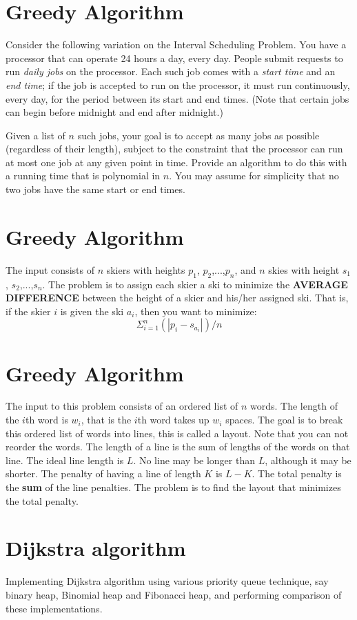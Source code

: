 \documentclass[a4paper,10pt]{article}
\begin{document}
\section{Greedy Algorithm}
Consider the following variation on the Interval Scheduling Problem. You have a processor that can operate 24 hours a day, every day. People submit requests to run \emph{daily jobs} on the processor. Each such job comes with a \emph{start time} and an \emph{end time}; if the job is accepted to run on the processor, it must run continuously, every day, for the period between its start and end times. (Note that certain jobs can begin before midnight and end after midnight.)

Given a list of $n$ such jobs, your goal is to accept as many jobs as possible (regardless of their length), subject to the constraint that the processor can run at most one job at any given point in time. Provide an algorithm to do this with a running time that is polynomial in $n$. You may assume for simplicity that no two jobs have the same start or end times.

\section{Greedy Algorithm}
The input consists of $n$ skiers with heights $p_1$, $p_2$,...,$p_n$, and $n$ skies with height $s_1$, $s_2$,...,$s_n$. The problem is to assign each skier a ski to minimize the {\bf AVERAGE DIFFERENCE} between the height of a skier and his/her assigned ski. That is, if the skier $i$ is given the ski $a_i$, then you want to minimize:$${\Sigma}_{i=1}^n (|p_i-s_{a_i}|)/n$$

\section{Greedy Algorithm}
The input to this problem consists of an ordered list of $n$ words. The length of the $i$th word is $w_i$, that is the $i$th word takes up $w_i$ spaces. The goal is to break this ordered list of words into lines, this is called a layout. Note that you can not reorder the words. The length of a line is the sum of lengths of the words on that line. The ideal line length is $L$. No line may be longer than $L$, although it may be shorter. The penalty of having a line of length $K$ is $L-K$. The total penalty is the {\bf sum} of the line penalties. The problem is to find the layout that minimizes the total penalty.

\section{Dijkstra algorithm} 
Implementing Dijkstra algorithm using various priority queue technique, say {\sc binary heap}, {\sc Binomial heap} and {\sc Fibonacci heap}, and performing comparison of these implementations. 
\end{document}
